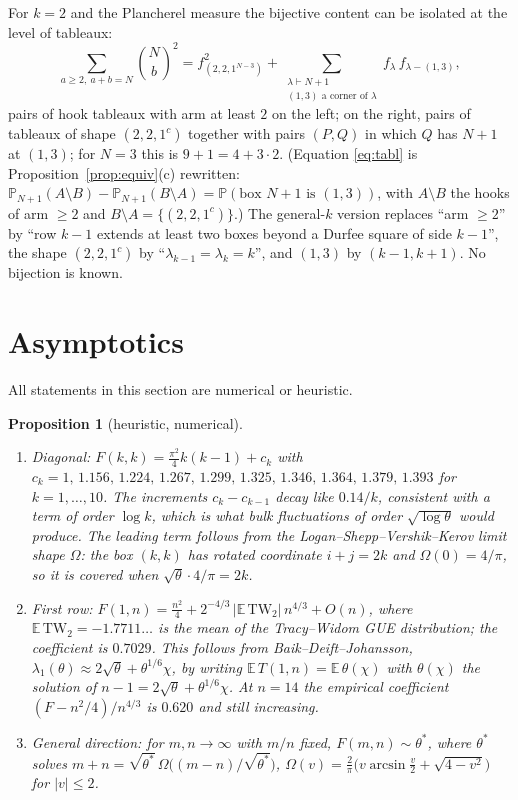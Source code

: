 \documentclass[11pt]{article}
\newtheorem{proposition}[theorem]{Proposition}
\theoremstyle{definition}
\theoremstyle{remark}
\newcommand{\E}{\mathbb{E}}
\newcommand{\Prob}{\mathbb{P}}
\begin{document}
For $k=2$ and the Plancherel measure the bijective content can be isolated at the level of tableaux:
\begin{equation}\label{eq:tabl}
\sum_{a\ge2,\ a+b=N}\binom Nb^2=f_{(2,2,1^{N-3})}^2+\sum_{\substack{\lambda\vdash N+1\\ (1,3)\text{ a corner of }\lambda}}f_\lambda\,f_{\lambda-(1,3)} ,
\end{equation}
pairs of hook tableaux with arm at least $2$ on the left; on the right, pairs of tableaux of shape $(2,2,1^c)$ together with pairs $(P,Q)$ in which $Q$ has $N+1$ at $(1,3)$; for $N=3$ this is $9+1=4+3\cdot2$. (Equation \eqref{eq:tabl} is Proposition~\ref{prop:equiv}(c) rewritten: $\Prob_{N+1}(A\setminus B)-\Prob_{N+1}(B\setminus A)=\Prob(\text{box }N+1\text{ is }(1,3))$, with $A\setminus B$ the hooks of arm $\ge2$ and $B\setminus A=\{(2,2,1^c)\}$.) The general-$k$ version replaces ``arm $\ge2$'' by ``row $k-1$ extends at least two boxes beyond a Durfee square of side $k-1$'', the shape $(2,2,1^c)$ by ``$\lambda_{k-1}=\lambda_k=k$'', and $(1,3)$ by $(k-1,k+1)$. No bijection is known.

\section{Asymptotics}\label{sec:asym}

All statements in this section are numerical or heuristic.

\begin{proposition}[heuristic, numerical]
\begin{enumerate}[label=(\roman*)]
\item Diagonal: $F(k,k)=\frac{\pi^2}4k(k-1)+c_k$ with $c_k=1,\,1.156,\,1.224,\,1.267,\,1.299,\,1.325,\,1.346,\,1.364,\,1.379,\,1.393$ for $k=1,\dots,10$. The increments $c_k-c_{k-1}$ decay like $0.14/k$, consistent with a term of order $\log k$, which is what bulk fluctuations of order $\sqrt{\log\theta}$ would produce. The leading term follows from the Logan--Shepp--Vershik--Kerov limit shape $\Omega$: the box $(k,k)$ has rotated coordinate $i+j=2k$ and $\Omega(0)=4/\pi$, so it is covered when $\sqrt\theta\cdot4/\pi=2k$.
\item First row: $F(1,n)=\frac{n^2}4+2^{-4/3}\,|\E\,\mathrm{TW}_2|\,n^{4/3}+O(n)$, where $\E\,\mathrm{TW}_2=-1.7711\ldots$ is the mean of the Tracy--Widom GUE distribution; the coefficient is $0.7029$. This follows from Baik--Deift--Johansson, $\lambda_1(\theta)\approx2\sqrt\theta+\theta^{1/6}\chi$, by writing $\E\,T(1,n)=\E\,\theta(\chi)$ with $\theta(\chi)$ the solution of $n-1=2\sqrt\theta+\theta^{1/6}\chi$. At $n=14$ the empirical coefficient $(F-n^2/4)/n^{4/3}$ is $0.620$ and still increasing.
\item General direction: for $m,n\to\infty$ with $m/n$ fixed, $F(m,n)\sim\theta^*$, where $\theta^*$ solves $m+n=\sqrt{\theta^*}\,\Omega\bigl((m-n)/\sqrt{\theta^*}\bigr)$, $\Omega(v)=\frac2\pi\bigl(v\arcsin\frac v2+\sqrt{4-v^2}\bigr)$ for $|v|\le2$.
\end{enumerate}
\end{proposition}
\end{document}
